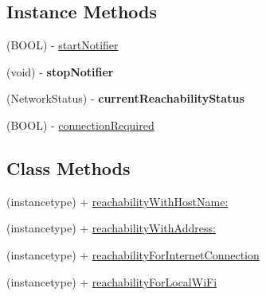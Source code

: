 \subsection*{Instance Methods}
\begin{DoxyCompactItemize}
\item 
(B\-O\-O\-L) -\/ \hyperlink{interface_reachability_ae20732960a222681fcc7caeb191158bc}{start\-Notifier}
\item 
\hypertarget{interface_reachability_ab7907e9c8de0e4e15774e82c089e0b39}{(void) -\/ {\bfseries stop\-Notifier}}\label{interface_reachability_ab7907e9c8de0e4e15774e82c089e0b39}

\item 
\hypertarget{interface_reachability_a8396438436e7ff3770039fb527cd1d34}{(Network\-Status) -\/ {\bfseries current\-Reachability\-Status}}\label{interface_reachability_a8396438436e7ff3770039fb527cd1d34}

\item 
(B\-O\-O\-L) -\/ \hyperlink{interface_reachability_a731496d70dd8bfbd1b364df13cac2b4c}{connection\-Required}
\end{DoxyCompactItemize}
\subsection*{Class Methods}
\begin{DoxyCompactItemize}
\item 
(instancetype) + \hyperlink{interface_reachability_a4e729345411817f077d873ee82c62a8a}{reachability\-With\-Host\-Name\-:}
\item 
(instancetype) + \hyperlink{interface_reachability_a10eca399184adb3a360296b236406257}{reachability\-With\-Address\-:}
\item 
(instancetype) + \hyperlink{interface_reachability_aba5c531ea84e2f6ed6b1cb25f0c87404}{reachability\-For\-Internet\-Connection}
\item 
(instancetype) + \hyperlink{interface_reachability_ad23f99b42e28143e250850196cccce70}{reachability\-For\-Local\-Wi\-Fi}
\end{DoxyCompactItemize}


